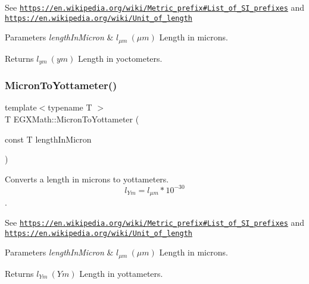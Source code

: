 See \href{https://en.wikipedia.org/wiki/Metric_prefix#List_of_SI_prefixes}{\tt https\+://en.\+wikipedia.\+org/wiki/\+Metric\+\_\+prefix\#\+List\+\_\+of\+\_\+\+S\+I\+\_\+prefixes} and \href{https://en.wikipedia.org/wiki/Unit_of_length}{\tt https\+://en.\+wikipedia.\+org/wiki/\+Unit\+\_\+of\+\_\+length} 
\begin{DoxyParams}{Parameters}
{\em length\+In\+Micron} & $ l_{\mu m}\ (\mu m)$ Length in microns. \\
\hline
\end{DoxyParams}
\begin{DoxyReturn}{Returns}
$ l_{ym}\ (ym)$ Length in yoctometers. 
\end{DoxyReturn}
\mbox{\label{group___e_g_x_math-_conversions-_length_conversions-_non-_s_i-_micron-_s_i_ga3510e5db7988e1fcaece5215a08eb485}} 
\subsubsection{\texorpdfstring{Micron\+To\+Yottameter()}{MicronToYottameter()}}
{\footnotesize\ttfamily template$<$typename T $>$ \\
T E\+G\+X\+Math\+::\+Micron\+To\+Yottameter (\begin{DoxyParamCaption}\item[{const T}]{length\+In\+Micron }\end{DoxyParamCaption})}



Converts a length in microns to yottameters. \[ l_{Ym}=l_{\mu m} * 10^{-30} \]. 

See \href{https://en.wikipedia.org/wiki/Metric_prefix#List_of_SI_prefixes}{\tt https\+://en.\+wikipedia.\+org/wiki/\+Metric\+\_\+prefix\#\+List\+\_\+of\+\_\+\+S\+I\+\_\+prefixes} and \href{https://en.wikipedia.org/wiki/Unit_of_length}{\tt https\+://en.\+wikipedia.\+org/wiki/\+Unit\+\_\+of\+\_\+length} 
\begin{DoxyParams}{Parameters}
{\em length\+In\+Micron} & $ l_{\mu m}\ (\mu m)$ Length in microns. \\
\hline
\end{DoxyParams}
\begin{DoxyReturn}{Returns}
$ l_{Ym}\ (Ym)$ Length in yottameters. 
\end{DoxyReturn}
\mbox{\label{group___e_g_x_math-_conversions-_length_conversions-_non-_s_i-_micron-_s_i_ga4b94a208fdb102d95ba62440f921875e}} 
